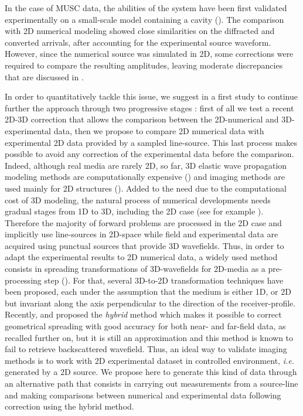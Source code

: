 \documentclass[extra,mreferee]{gji}
\begin{document}
In the case of MUSC data, the abilities of the system have been first validated experimentally on a small-scale model containing a cavity (\cite{bretaudeau2011ssm}). The comparison with 2D numerical modeling showed close similarities on the diffracted and converted arrivals, after accounting for the experimental source waveform. However, since the numerical source was simulated in 2D, some corrections were required to compare the resulting amplitudes, leaving moderate discrepancies that are discussed in \cite{bretaudeau2011ssm}.

In order to quantitatively tackle this issue, we suggest in a first study to continue further the approach through two progressive stages : first of all we test a recent 2D-3D correction that allows the comparison between the 2D-numerical and 3D-experimental data, then we propose to compare 2D numerical data with experimental 2D data provided by a sampled line-source. This last process makes possible to avoid any correction of the experimental data before the comparison. Indeed, although real media are rarely 2D, so far, 3D elastic wave propagation modeling methods are computationally expensive (\cite{etienne2010computational,borisov2013efficient,brossier2013performances,butzer20133d,borisov2015three}) and imaging methods are used mainly for 2D structures (\cite{brossier2009two,romdhane2011shallow,bretaudeau2013fwi,groos2014role}). Added to the need due to the computational cost of 3D modeling, the natural process of numerical developments needs gradual stages from 1D to 3D, including the 2D case (see for example \cite{capdeville2010nonperiodic}). Therefore the majority of forward problems are processed in the 2D case and implicitly use line-sources in 2D-space while field and experimental data are acquired using punctual sources that provide 3D wavefields. Thus, in order to adapt the experimental results to 2D numerical data, a widely used method consists in spreading transformations of 3D-wavefields for 2D-media as a pre-processing step (\cite{crase1990robust,shipp2002two,ravaut2004multiscale,wang2009reflection,bretaudeau2013fwi}). For that, several 3D-to-2D transformation techniques have been proposed, each under the assumption that the medium is either 1D, or 2D but invariant along the axis perpendicular to the direction of the receiver-profile. Recently, \cite{Forbriger_LSS_2014} and \cite{schafer2014lss} proposed the \textit{hybrid} method which makes it possible to correct geometrical spreading with good accuracy for both near- and far-field data, as recalled further on, but it is still an approximation and this method is known to fail to retrieve backscattered wavefield. Thus, an ideal way to validate imaging methods is to work with 2D experimental dataset in controlled environment, \textit{i.e.} generated by a 2D source. We propose here to generate this kind of data through an alternative path that consists in carrying out measurements from a source-line and making comparisons between numerical and experimental data following correction using the hybrid method.
\end{document}
